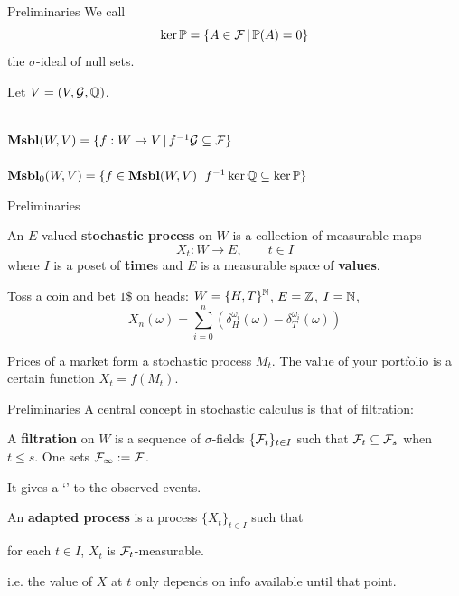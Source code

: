 \begin{frame}{Preliminaries}
	We call
	\begin{equation*}
		\ker \mathbb{P} = \{A \in \mathcal{F} \,|\, \mathbb{P}(A) = 0 \}
	\end{equation*}
	the $\sigma$-ideal of null sets.

	\vfill
	Let $V = (V, \mathcal{G}, \mathbb{Q})$.
	\begin{center}
		\\
		$\mathbf{Msbl}(W, V) = \{ f : W \to V \,|\, f^{-1}\mathcal{G} \subseteq \mathcal{F}\}$\\[2ex]

		\\
		$\mathbf{Msbl}_0(W, V) = \{ f \in \mathbf{Msbl}(W, V) \,|\, f^{-1}\ker\mathbb{Q} \subseteq \ker \mathbb{P}\}$
	\end{center}
\end{frame}

\begin{frame}{Preliminaries}
	\begin{definition}
		An $E$-valued \textbf{stochastic process} on $W$ is a collection of measurable maps
		\begin{equation*}
			X_t : W \to E, \qquad t \in I
		\end{equation*}
		where $I$ is a poset of \textbf{time}s and $E$ is a measurable space of \textbf{values}.
	\end{definition}

	\begin{example}
		Toss a coin and bet $1\$$ on heads: $W = \{H,T\}^{\mathbb{N}}$, $E = \mathbb{Z}$, $I = \mathbb{N}$,
		\begin{equation*}
			X_n(\omega) = \sum_{i=0}^n (\delta^{\omega_i}_H(\omega) - \delta^{\omega_i}_T(\omega))
		\end{equation*}
	\end{example}
	\vspace{-3ex}
	\begin{example}
		Prices of a market form a stochastic process $M_t$. The value of your portfolio is a certain function $X_t = f(M_t)$.
	\end{example}
\end{frame}

\begin{frame}{Preliminaries}
	A central concept in stochastic calculus is that of filtration:
	\begin{definition}
		A \textbf{filtration} on $W$ is a sequence of $\sigma$-fields $\{\mathcal{F}_t\}_{t \in I}$ such that $\mathcal{F}_t \subseteq \mathcal{F}_s$ when $t \leq s$. One sets $\mathcal{F}_\infty := \mathcal{F}$.
	\end{definition}

	\vfill
	It gives a `' to the observed events.

	\vfill
	\begin{definition}
		An \textbf{adapted process} is a process $\{X_t\}_{t \in I}$ such that
		\begin{center}
			for each $t \in I$, \quad $X_t$ is $\mathcal{F}_t$-measurable.
		\end{center}
	\end{definition}
	i.e. the value of $X$ at $t$ only depends on info available until that point.
\end{frame}

